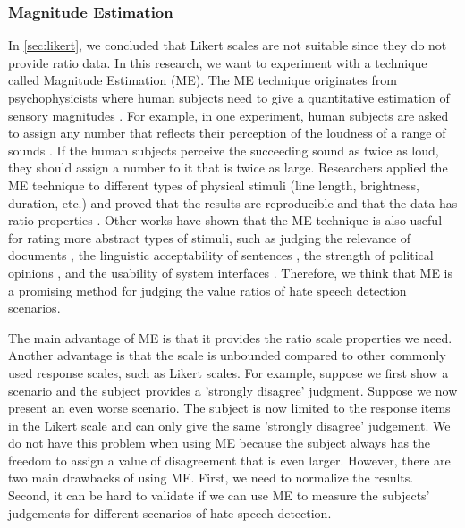 \documentclass[a4paper]{article}
\begin{document}
\subsubsection{Magnitude Estimation}
\label{sec:me}
In \ref{sec:likert}, we concluded that Likert scales are not suitable since they do not provide ratio data. In this research, we want to experiment with a technique called Magnitude Estimation (ME). The ME technique originates from psychophysicists where human subjects need to give a quantitative estimation of sensory magnitudes \cite{stevens1956direct}. For example, in one experiment, human subjects are asked to assign any number that reflects their perception of the loudness of a range of sounds \cite{stevens1956direct}. If the human subjects perceive the succeeding sound as twice as loud, they should assign a number to it that is twice as large. Researchers applied the ME technique to different types of physical stimuli (line length, brightness, duration, etc.) and proved that the results are reproducible and that the data has ratio properties \cite{moskowitz1977magnitude}. Other works have shown that the ME technique is also useful for rating more abstract types of stimuli, such as judging the relevance of documents \cite{maddalena2017crowdsourcing}, the linguistic acceptability of sentences \cite{bard1996magnitude}, the strength of political opinions \cite{lodge1979comparisons, lodge1976calibration}, and the usability of system interfaces \cite{mcgee2004master}. Therefore, we think that ME is a promising method for judging the value ratios of hate speech detection scenarios.

The main advantage of ME is that it provides the ratio scale properties we need. Another advantage is that the scale is unbounded compared to other commonly used response scales, such as Likert scales. For example, suppose we first show a scenario and the subject provides a 'strongly disagree' judgment. Suppose we now present an even worse scenario. The subject is now limited to the response items in the Likert scale and can only give the same 'strongly disagree' judgement. We do not have this problem when using ME because the subject always has the freedom to assign a value of disagreement that is even larger. However, there are two main drawbacks of using ME. First, we need to normalize the results. Second, it can be hard to validate if we can use ME to measure the subjects' judgements for different scenarios of hate speech detection.
\end{document}
